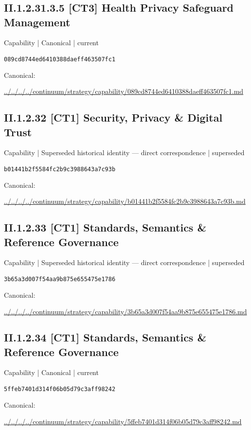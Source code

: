 \documentclass[10pt,a4paper]{article}
\begin{document}
\subsection*{II.1.2.31.3.5 [CT3] Health Privacy Safeguard Management}
{\small Capability | Canonical | current}\par
\texttt{089cd8744ed6410388daeff463507fc1}\par
Canonical: \par
{\footnotesize\url{../../../../continuum/strategy/capability/089cd8744ed6410388daeff463507fc1.md}}\par
\subsection*{II.1.2.32 [CT1] Security, Privacy \& Digital Trust}
{\small Capability | Superseded historical identity — direct correspondence | superseded}\par
\texttt{b01441b2f5584fc2b9c3988643a7c93b}\par
Canonical: \par
{\footnotesize\url{../../../../continuum/strategy/capability/b01441b2f5584fc2b9c3988643a7c93b.md}}\par
\subsection*{II.1.2.33 [CT1] Standards, Semantics \& Reference Governance}
{\small Capability | Superseded historical identity — direct correspondence | superseded}\par
\texttt{3b65a3d007f54aa9b875e655475e1786}\par
Canonical: \par
{\footnotesize\url{../../../../continuum/strategy/capability/3b65a3d007f54aa9b875e655475e1786.md}}\par
\subsection*{II.1.2.34 [CT1] Standards, Semantics \& Reference Governance}
{\small Capability | Canonical | current}\par
\texttt{5ffeb7401d314f06b05d79c3aff98242}\par
Canonical: \par
{\footnotesize\url{../../../../continuum/strategy/capability/5ffeb7401d314f06b05d79c3aff98242.md}}\par
\end{document}
